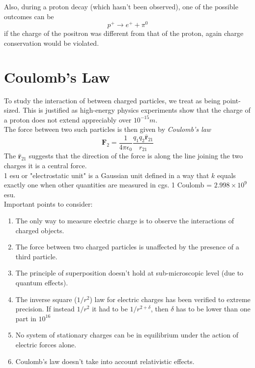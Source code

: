 \documentclass{article}
\begin{document}
	Also, during a proton decay (which hasn't been observed), one of the possible outcomes can be
		$$ p^+ \rightarrow e^+ + \pi^0 $$
	if the charge of the positron was different from that of the proton, again charge conservation would be violated.
	
	\section*{Coulomb's Law}
	To study the interaction of between charged  particles, we treat as being point-sized. This is justified as high-energy physics experiments show that the charge of a proton does not extend appreciably over $10^{-15} m$.\\
	
	The force between two such particles is then given by \textit{Coulomb's law}
	\begin{equation}\textbf{F}_2 = \frac{1}{4\pi\epsilon_0}\frac{q_1q_2\hat{\textbf{r}}_{21}}{r_{21}}
	\end{equation}
	The $\hat{\textbf{r}}_{21}$ suggests that the direction of the force is along the line joining the two charges \textemdash it is a central force.\\
	
	1 esu or "electrostatic unit" is a Gaussian unit defined in a way that $k$ equals exactly one when  other quantities are measured in cgs. 1 Coulomb = $2.998 \times 10^9$ esu.\\
	
	Important points to consider:
	
	\begin{enumerate}
		\item The only way to measure electric charge is to observe the interactions of charged objects.
		\item The force between two charged particles is unaffected by the presence of a third particle.
		\item The principle of superposition doesn't hold at sub-microscopic level (due to quantum effects).
		\item The inverse square ($1/r^2$) law for electric charges has been verified to extreme precision. If instead $1/r^2$ it had to be $1/r^{2+\delta}$, then $\delta$ has to be lower than one part in $10^{16}$
		\item No system of stationary charges can be in equilibrium under the action of electric forces alone.
		\item Coulomb's law doesn't take into account relativistic effects.
	\end{enumerate}
	
\end{document}
